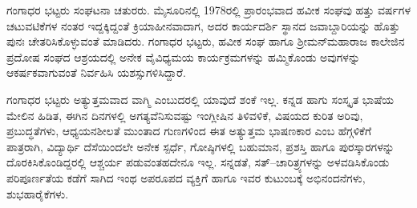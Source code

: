 {ಗಂಗಾಧರ ಭಟ್ಟರು ಸಂಘಟನಾ ಚತುರರು.  ಮೈಸೂರಿನಲ್ಲಿ 1978ರಲ್ಲಿ ಪ್ರಾರಂಭವಾದ ಹವೀಕ ಸಂಘವು ಹತ್ತು ವರ್ಷಗಳ ಚಟುವಟಿಕೆಗಳ ನಂತರ ಇದ್ದಕ್ಕಿದ್ದಂತೆ ಕ್ರಿಯಾಹೀನವಾದಾಗ, ಅದರ ಕಾರ್ಯದರ್ಶಿ ಸ್ಥಾನದ ಜವಾಬ್ದಾರಿಯನ್ನು ಹೊತ್ತು ಪುನಃ ಚೇತರಿಸಿಕೊಳ್ಳುವಂತೆ ಮಾಡಿದರು.  ಗಂಗಾಧರ ಭಟ್ಟರು, ಹವೀಕ ಸಂಘ ಹಾಗೂ  ಶ್ರೀಮನ್‍ಮಹಾರಾಜ ಕಾಲೇಜಿನ ಪ್ರದೋಷ ಸಂಘದ ಆಶ್ರಯದಲ್ಲಿ ಅನೇಕ ವೈವಿಧ್ಯಮಯ ಕಾರ್ಯಕ್ರಮಗಳನ್ನು ಹಮ್ಮಿಕೊಂಡು ಅವುಗಳನ್ನು ಆಕರ್ಷಕವಾಗುವಂತೆ ನಿರ್ವಹಿಸಿ ಯಶಸ್ಸುಗಳಿಸಿದ್ದಾರೆ.  

ಗಂಗಾಧರ ಭಟ್ಟರು ಅತ್ಯುತ್ತಮವಾದ ವಾಗ್ಮಿ ಎಂಬುದರಲ್ಲಿ ಯಾವುದೆ ಶಂಕೆ ಇಲ್ಲ.  ಕನ್ನಡ ಹಾಗು ಸಂಸ್ಕೃತ ಭಾಷೆಯ ಮೇಲಿನ ಹಿಡಿತ, ಈಗಿನ ದಿನಗಳಲ್ಲಿ ಅಗತ್ಯವೆನಿಸುವಷ್ಟು ಇಂಗ್ಲೀಷಿನ ತಿಳಿವಳಿಕೆ, ವಿಷಯದ ಕುರಿತ ಅರಿವು, ಪ್ರಬುದ್ಧತೆಗಳು,  ಆಧ್ಯಯನಶೀಲತೆ ಮುಂತಾದ ಗುಣಗಳಿಂದ ಈತ ಅತ್ಯುತ್ತಮ ಭಾಷಣಕಾರ ಎಂಬ ಹೆಗ್ಗಳಿಕೆಗೆ ಪಾತ್ರರಾಗಿ, ವಿದ್ಯಾರ್ಥಿ ದೆಸೆಯಿಂದಲೇ ಅನೇಕ ಸ್ಪರ್ಧೆ, ಗೋಷ್ಠಿಗಳಲ್ಲಿ ಬಹುಮಾನ, ಪ್ರಶಸ್ತಿ ಹಾಗೂ ಪುರಸ್ಕಾರಗಳನ್ನು ದೊರಕಿಸಿಕೊಂಡಿದ್ದರಲ್ಲಿ ಆಶ್ಚರ್ಯ ಪಡುವಂತಹದೇನೂ ಇಲ್ಲ.  ಸನ್ನಡತೆ, ಸತ್–ಚಾರಿತ್ರ್ಯಗಳನ್ನು ಅಳವಡಿಸಿಕೊಂಡು ಪರಿಪೂರ್ಣತೆಯ ಕಡೆಗೆ ಸಾಗಿದ ಇಂಥ ಅಪರೂಪದ ವ್ಯಕ್ತಿಗೆ ಹಾಗೂ ಇವರ ಕುಟುಂಬಕ್ಕೆ ಅಭಿನಂದನೆಗಳು, ಶುಭಹಾರೈಕೆಗಳು.   

\articleend
}
